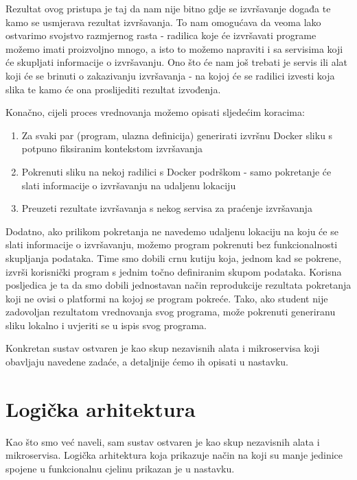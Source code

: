 \documentclass[times, utf8, zavrsni]{fer}
\begin{document}
Rezultat ovog pristupa je taj da nam nije bitno gdje se izvršavanje događa te kamo se usmjerava rezultat izvršavanja. To nam omogućava da veoma lako ostvarimo svojstvo razmjernog rasta - radilica koje će izvršavati programe možemo imati proizvoljno mnogo, a isto to možemo napraviti i sa servisima koji će skupljati informacije o izvršavanju. Ono što će nam još trebati je servis ili alat koji će se brinuti o zakazivanju izvršavanja - na kojoj će se radilici izvesti koja slika te kamo će ona proslijediti rezultat izvođenja.

Konačno, cijeli proces vrednovanja možemo opisati sljedećim koracima:

\begin{enumerate}
\item Za svaki par (program, ulazna definicija) generirati izvršnu Docker sliku s potpuno fiksiranim kontekstom izvršavanja
\item Pokrenuti sliku na nekoj radilici s Docker podrškom - samo pokretanje će slati informacije o izvršavanju na udaljenu lokaciju
\item Preuzeti rezultate izvršavanja s nekog servisa za praćenje izvršavanja
\end{enumerate}

Dodatno, ako prilikom pokretanja ne navedemo udaljenu lokaciju na koju će se slati informacije o izvršavanju, možemo program pokrenuti bez funkcionalnosti skupljanja podataka. Time smo dobili crnu kutiju koja, jednom kad se pokrene, izvrši korisnički program s jednim točno definiranim skupom podataka. Korisna posljedica je ta da smo dobili jednostavan način reprodukcije rezultata pokretanja koji ne ovisi o platformi na kojoj se program pokreće. Tako, ako student nije zadovoljan rezultatom vrednovanja svog programa, može pokrenuti generiranu sliku lokalno i uvjeriti se u ispis svog programa.

Konkretan sustav ostvaren je kao skup nezavisnih alata i mikroservisa koji obavljaju navedene zadaće, a detaljnije ćemo ih opisati u nastavku.

\section{Logička arhitektura}

Kao što smo već naveli, sam sustav ostvaren je kao skup nezavisnih alata i mikroservisa. Logička arhitektura koja prikazuje način na koji su manje jedinice spojene u funkcionalnu cjelinu prikazan je u nastavku.
\end{document}
